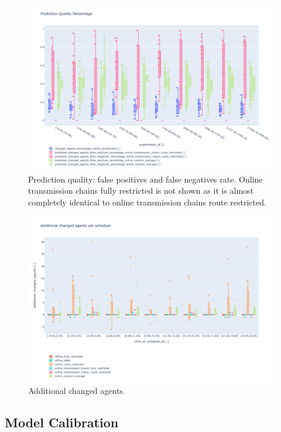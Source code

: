 \documentclass{article}
\begin{document}
\begin{figure}[hbtp]
    \includegraphics[width=\textwidth]{Figures/04_computational_results/prediction_quality.pdf}
	\caption{Prediction quality: false positives and false negatives rate. Online transmission chains fully restricted is not shown as it is almost completely identical to online transmission chains route restricted.}
	\label{fig:prediction_quality}
\end{figure}

\begin{figure}[hbtp]
    \includegraphics[width=\textwidth]{Figures/04_computational_results/additional_changed_agents.pdf}
	\caption{Additional changed agents.}
	\label{fig:additional_changed_agents}
\end{figure}

\subsection{Model Calibration}\label{subsec:model_calibration}
\end{document}
